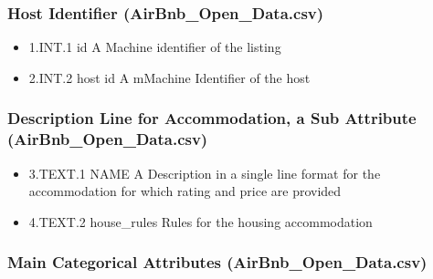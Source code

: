 \documentclass[11pt]{article}
\providecommand{\tightlist}{%
      \setlength{\itemsep}{0pt}\setlength{\parskip}{0pt}}
\begin{document}
    \hypertarget{host-identifier-airbnb_open_data.csv}{%
\subsubsection{Host Identifier
(AirBnb\_Open\_Data.csv)}\label{host-identifier-airbnb_open_data.csv}}

\begin{itemize}
\tightlist
\item
  1.INT.1 id A Machine identifier of the listing
\item
  2.INT.2 host id A mMachine Identifier of the host
\end{itemize}

\hypertarget{description-line-for-accommodation-a-sub-attribute-airbnb_open_data.csv}{%
\subsubsection{Description Line for Accommodation, a Sub Attribute
(AirBnb\_Open\_Data.csv)}\label{description-line-for-accommodation-a-sub-attribute-airbnb_open_data.csv}}

\begin{itemize}
\tightlist
\item
  3.TEXT.1 NAME A Description in a single line format for the
  accommodation for which rating and price are provided
\item
  4.TEXT.2 house\_rules Rules for the housing accommodation
\end{itemize}

\hypertarget{main-categorical-attributes-airbnb_open_data.csv}{%
\subsubsection{Main Categorical Attributes
(AirBnb\_Open\_Data.csv)}\label{main-categorical-attributes-airbnb_open_data.csv}}
\end{document}
